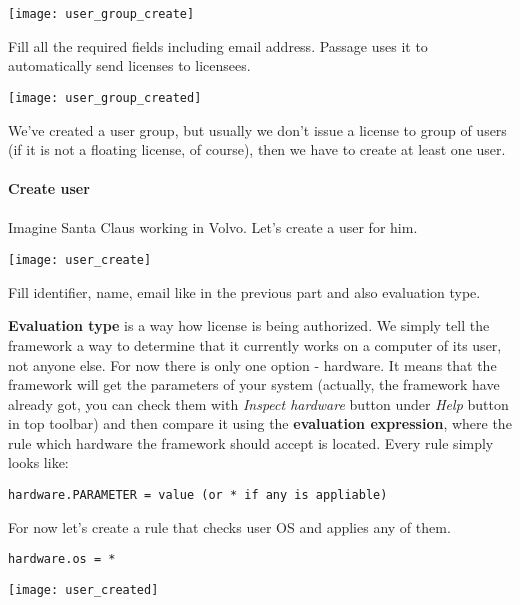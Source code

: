 \documentclass[12pt]{report}
\begin{document}
\begin{center}
    \texttt{[image: user\_group\_create]}
\end{center}

Fill all the required fields including email address. Passage uses it to automatically send licenses to licensees.

\begin{center}
    \texttt{[image: user\_group\_created]}
\end{center}

We've created a user group, but usually we don't issue a license to group of users (if it is not a floating license, of course), then we have to create at least one user.

\paragraph*{Create user}
\paragraph*{}

Imagine Santa Claus working in Volvo. Let's create a user for him.

\begin{center}
    \texttt{[image: user\_create]}
\end{center}

Fill identifier, name, email like in the previous part and also evaluation type.

\textbf{Evaluation type} is a way how license is being authorized. We simply tell the framework a way to determine that it currently works on a computer of its user, not anyone else.
For now there is only one option - hardware. It means that the framework will get the parameters of your system 
(actually, the framework have already got, you can check them with \textit{Inspect hardware} button under \textit{Help} button in top toolbar) and then compare it using the 
\textbf{evaluation expression}, where the rule which hardware the framework should accept is located. Every rule simply looks like:

\verb|hardware.PARAMETER = value (or * if any is appliable)|

For now let's create a rule that checks user OS and applies any of them.

\verb|hardware.os = *|

\begin{center}
    \texttt{[image: user\_created]}
\end{center}
\end{document}

